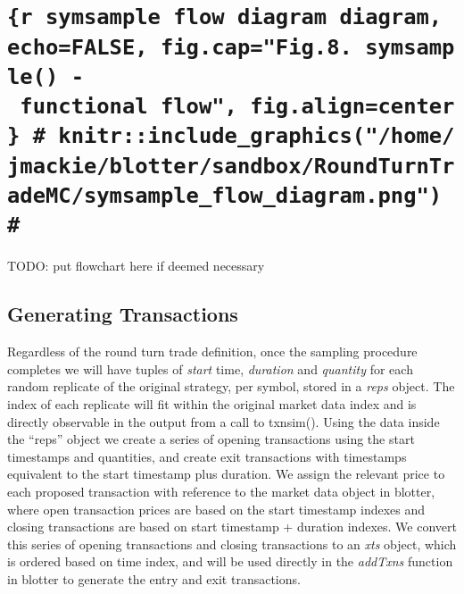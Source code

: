 \hypertarget{r-symsample-flow-diagram-diagram-echofalse-fig.capfig.8.-symsample---functional-flow-fig.aligncenter-knitrinclude_graphicshomejmackieblottersandboxroundturntrademcsymsample_flow_diagram.png}{%
\section{\texorpdfstring{\texttt{\{r\ symsample\ flow\ diagram\ diagram,\ echo=FALSE,\ fig.cap="Fig.8.\ symsample()\ -\ functional\ flow",\ fig.align=\textquotesingle{}center\textquotesingle{}\}\ \#\ knitr::include\_graphics("/home/jmackie/blotter/sandbox/RoundTurnTradeMC/symsample\_flow\_diagram.png")\ \#}}{\{r symsample flow diagram diagram, echo=FALSE, fig.cap="Fig.8. symsample() - functional flow", fig.align='center'\} \# knitr::include\_graphics("/home/jmackie/blotter/sandbox/RoundTurnTradeMC/symsample\_flow\_diagram.png") \#}}\label{r-symsample-flow-diagram-diagram-echofalse-fig.capfig.8.-symsample---functional-flow-fig.aligncenter-knitrinclude_graphicshomejmackieblottersandboxroundturntrademcsymsample_flow_diagram.png}}

TODO: put flowchart here if deemed necessary

\hypertarget{generating-transactions}{%
\subsection{Generating Transactions}\label{generating-transactions}}

Regardless of the round turn trade definition, once the sampling
procedure completes we will have tuples of \emph{start} time,
\emph{duration} and \emph{quantity} for each random replicate of the
original strategy, per symbol, stored in a \emph{reps} object. The index
of each replicate will fit within the original market data index and is
directly observable in the output from a call to txnsim(). Using the
data inside the ``reps'' object we create a series of opening
transactions using the start timestamps and quantities, and create exit
transactions with timestamps equivalent to the start timestamp plus
duration. We assign the relevant price to each proposed transaction with
reference to the market data object in blotter, where open transaction
prices are based on the start timestamp indexes and closing transactions
are based on start timestamp + duration indexes. We convert this series
of opening transactions and closing transactions to an \emph{xts}
object, which is ordered based on time index, and will be used directly
in the \emph{addTxns} function in blotter to generate the entry and exit
transactions.

